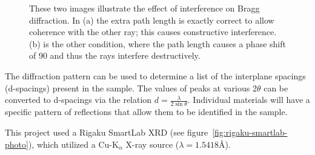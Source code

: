 \begin{figure}[htbp]
   \centering
	\hspace{0.5cm}
   \caption[Illustration of Bragg's Law]%
   		{These two images illustrate the effect of interference on Bragg diffraction. In (a) the extra %
		path length is exactly correct to allow coherence with the other ray; this causes constructive %
		interference. (b) is the other condition, where the path length causes a phase shift of 90\Deg{}%
		and thus the rays interfere destructively.}
   \label{fig:braggs-law}
\end{figure}

The diffraction pattern can be used to determine a list of the interplane spacings (d-spacings) present in the sample. The values of peaks at various 2$\theta$ can be converted to d-spacings via the relation $d=\frac{\lambda}{2\sin\theta}$. Individual materials will have a specific pattern of reflections that allow them to be identified in the sample. 

This project used a Rigaku SmartLab XRD (see figure~\vref{fig:rigaku-smartlab-photo}), which utilized a Cu-K$_{\alpha}$ X-ray source ($\lambda = 1.5418$\AA).

